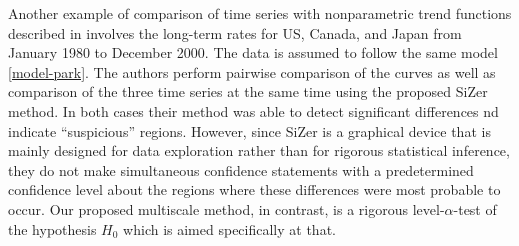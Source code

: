 \documentclass[a4paper,12pt]{article}
\begin{document}
\begin{example}
Another example of comparison of time series with nonparametric trend functions described in \cite{Park2009} involves the long-term rates for US, Canada, and Japan from January 1980 to December 2000. The data is assumed to follow the same model \eqref{model-park}. The authors perform pairwise comparison of the curves as well as comparison of the three time series at the same time using the proposed Si{Z}er method. In both cases their method was able to detect significant differences nd indicate ``suspicious'' regions. However, since Si{Z}er is a graphical device that is mainly designed for data exploration rather than for rigorous statistical inference, they do not make simultaneous confidence statements with a predetermined confidence level about the regions where these differences were most probable to occur. Our proposed multiscale method, in contrast, is a rigorous level-$\alpha$-test of the hypothesis $H_0$ which is aimed specifically at that.


\end{example}
\end{document}
